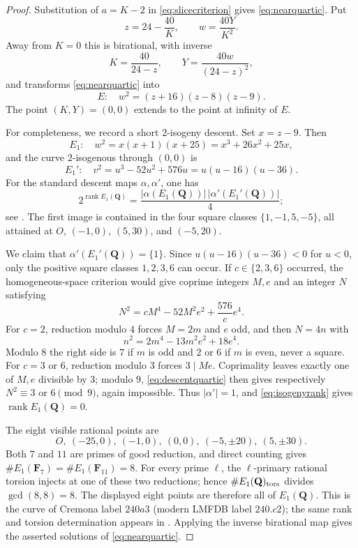 \documentclass[11pt,reqno]{amsart}
\theoremstyle{definition}
\theoremstyle{remark}
\DeclareMathOperator{\rank}{rank}
\newcommand{\Q}{\mathbf Q}
\begin{document}
\begin{proof}
Substitution of $a=K-2$ in \eqref{eq:slicecriterion} gives
\eqref{eq:nearquartic}.  Put
\begin{equation}\label{eq:near-map}
 z=24-\frac{40}{K},\qquad w=\frac{40Y}{K^2}.
\end{equation}
Away from $K=0$ this is birational, with inverse
\[
 K=\frac{40}{24-z},\qquad Y=\frac{40w}{(24-z)^2},
\]
and transforms \eqref{eq:nearquartic} into
\begin{equation}\label{eq:nearE}
 E:\quad w^2=(z+16)(z-8)(z-9).
\end{equation}
The point $(K,Y)=(0,0)$ extends to the point at infinity of $E$.

For completeness, we record a short $2$-isogeny descent.  Set $x=z-9$.
Then
\[
 E_1:\quad w^2=x(x+1)(x+25)=x^3+26x^2+25x,
\]
and the curve $2$-isogenous through $(0,0)$ is
\[
 E_1':\quad v^2=u^3-52u^2+576u=u(u-16)(u-36).
\]
For the standard descent maps $\alpha,\alpha'$, one has
\begin{equation}\label{eq:isogenyrank}
 2^{\rank E_1(\Q)}
 =\frac{|\alpha(E_1(\Q))|\,|\alpha'(E_1'(\Q))|}{4};
\end{equation}
see \cite[Chapter~III]{cremona}.  The first image is contained in the four
square classes $\{1,-1,5,-5\}$, all attained at
$O$, $(-1,0)$, $(5,30)$, and $(-5,20)$.

We claim that $\alpha'(E_1'(\Q))=\{1\}$.  Since
$u(u-16)(u-36)<0$ for $u<0$, only the positive square classes
$1,2,3,6$ can occur.  If $c\in\{2,3,6\}$ occurred, the homogeneous-space
criterion would give coprime integers $M,e$ and an integer $N$ satisfying
\begin{equation}\label{eq:descentquartic}
 N^2=cM^4-52M^2e^2+\frac{576}{c}e^4.
\end{equation}
For $c=2$, reduction modulo $4$ forces $M=2m$ and $e$ odd, and then
$N=4n$ with
\[
 n^2=2m^4-13m^2e^2+18e^4.
\]
Modulo $8$ the right side is $7$ if $m$ is odd and $2$ or $6$ if $m$ is
even, never a square.  For $c=3$ or $6$, reduction modulo $3$ forces
$3\mid Me$.  Coprimality leaves exactly one of $M,e$ divisible by $3$;
modulo $9$, \eqref{eq:descentquartic} then gives respectively
$N^2\equiv3$ or $6\pmod9$, again impossible.  Thus
$|\alpha'|=1$, and \eqref{eq:isogenyrank} gives $\rank E_1(\Q)=0$.

The eight visible rational points are
\[
 O,\ (-25,0),\ (-1,0),\ (0,0),\ (-5,\pm20),\ (5,\pm30).
\]
Both $7$ and $11$ are primes of good reduction, and direct counting gives
$\#E_1(\mathbf F_7)=\#E_1(\mathbf F_{11})=8$.  For every prime $\ell$, the
$\ell$-primary rational torsion injects at one of these two reductions;
hence $\#E_1(\Q)_{\rm tors}$ divides $\gcd(8,8)=8$.  The displayed eight
points are therefore all of $E_1(\Q)$.  This is the curve of Cremona label
$240a3$ (modern
LMFDB label $240.c2$); the same rank and torsion determination appears in
\cite[Proposition~5]{gonzalezxarles}.  Applying the inverse birational map
gives the asserted solutions of \eqref{eq:nearquartic}.


\end{proof}
\end{document}
